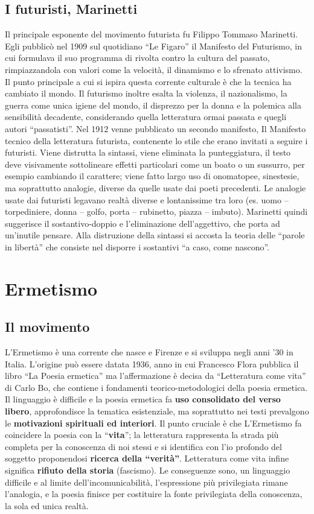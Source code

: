 \documentclass[12pt]{report}
\begin{document}
		\section[Marinetti]{I futuristi, Marinetti}
		Il principale esponente del movimento futurista fu Filippo Tommaso Marinetti. Egli pubblicò nel 1909 sul quotidiano “Le Figaro” il Manifesto del Futurismo, in cui formulava il suo programma di rivolta contro la cultura del passato, rimpiazzandola con valori come la velocità, il dinamismo e lo sfrenato attivismo. Il punto principale a cui si ispira questa corrente culturale è che la tecnica ha cambiato il mondo. Il futurismo inoltre esalta la violenza, il nazionalismo, la guerra come unica igiene del mondo, il disprezzo per la donna e la polemica alla sensibilità decadente, considerando quella letteratura ormai passata e quegli autori “passatisti”.
		Nel 1912 venne pubblicato un secondo manifesto, Il Manifesto tecnico della letteratura futurista, contenente lo stile che erano invitati a seguire i futuristi. Viene distrutta la sintassi, viene eliminata la punteggiatura, il testo deve visivamente sottolineare effetti particolari come un boato o un sussurro, per esempio cambiando il carattere; viene fatto largo uso di onomatopee, sinestesie, ma soprattutto analogie, diverse da quelle usate dai poeti precedenti. Le analogie usate dai futuristi legavano realtà diverse e lontanissime tra loro (es. uomo – torpediniere, donna – golfo, porta – rubinetto, piazza – imbuto). Marinetti quindi suggerisce il sostantivo-doppio e l’eliminazione dell’aggettivo, che porta ad un’inutile pensare. Alla distruzione della sintassi si accosta la teoria delle “parole in libertà” che consiste nel disporre i sostantivi “a caso, come nascono”.
		

	\chapter{Ermetismo}
		\section{Il movimento}
		L’Ermetismo è una corrente che nasce e Firenze e si sviluppa negli anni ’30 in Italia. L’origine può essere datata 1936, anno in cui Francesco Flora pubblica il libro “La Poesia ermetica” ma l’affermazione è decisa da “Letteratura come vita” di Carlo Bo, che contiene i fondamenti teorico-metodologici della poesia ermetica. 
		Il linguaggio è difficile e la poesia ermetica fa \textbf{uso consolidato del verso libero}, approfondisce la tematica esistenziale, ma soprattutto nei testi prevalgono le \textbf{motivazioni spirituali ed interiori}. 
		Il punto cruciale è che L’Ermetismo fa coincidere la poesia con la “\textbf{vita}”; la letteratura rappresenta la strada più completa per la conoscenza di noi stessi e si identifica con l’io profondo del soggetto proponendosi \textbf{ricerca della “verità”}.
		 Letteratura come vita infine significa \textbf{rifiuto della storia} (fascismo).
		Le conseguenze sono, un linguaggio difficile e al limite dell’incomunicabilità, l’espressione più privilegiata rimane l’analogia, e la poesia finisce per costituire la fonte privilegiata della conoscenza, la sola ed unica realtà.
		
\end{document}
